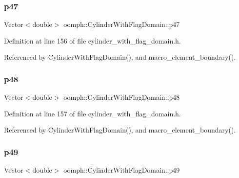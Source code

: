 \subsubsection{\texorpdfstring{p47}{p47}}
{\footnotesize\ttfamily Vector$<$double$>$ oomph\+::\+Cylinder\+With\+Flag\+Domain\+::p47\hspace{0.3cm}{\ttfamily [private]}}



Definition at line 156 of file cylinder\+\_\+with\+\_\+flag\+\_\+domain.\+h.



Referenced by Cylinder\+With\+Flag\+Domain(), and macro\+\_\+element\+\_\+boundary().

\mbox{\label{classoomph_1_1CylinderWithFlagDomain_ae02eac305b33b85a2e87df1764e4b8d8}} 
\subsubsection{\texorpdfstring{p48}{p48}}
{\footnotesize\ttfamily Vector$<$double$>$ oomph\+::\+Cylinder\+With\+Flag\+Domain\+::p48\hspace{0.3cm}{\ttfamily [private]}}



Definition at line 157 of file cylinder\+\_\+with\+\_\+flag\+\_\+domain.\+h.



Referenced by Cylinder\+With\+Flag\+Domain(), and macro\+\_\+element\+\_\+boundary().

\mbox{\label{classoomph_1_1CylinderWithFlagDomain_aa5418e036166408fb5df662d93479a84}} 
\subsubsection{\texorpdfstring{p49}{p49}}
{\footnotesize\ttfamily Vector$<$double$>$ oomph\+::\+Cylinder\+With\+Flag\+Domain\+::p49\hspace{0.3cm}{\ttfamily [private]}}



